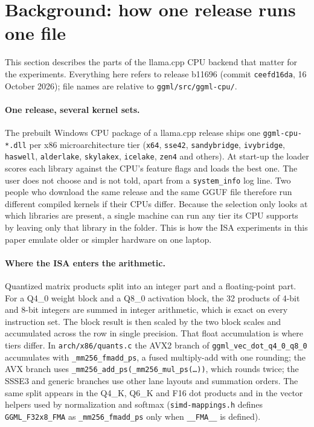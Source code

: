 \section{Background: how one release runs one file}
\label{sec:background}

This section describes the parts of the llama.cpp CPU backend that matter for the experiments.
Everything here refers to release b11696 (commit \texttt{ceefd16da}, 16 October 2026); file
names are relative to \texttt{ggml/src/ggml-cpu/}.

\paragraph{One release, several kernel sets.}
The prebuilt Windows CPU package of a llama.cpp release ships one \texttt{ggml-cpu-*.dll} per
x86 microarchitecture tier (\texttt{x64}, \texttt{sse42}, \texttt{sandybridge},
\texttt{ivybridge}, \texttt{haswell}, \texttt{alderlake}, \texttt{skylakex}, \texttt{icelake},
\texttt{zen4} and others). At start-up the loader scores each library against the CPU's feature
flags and loads the best one. The user does not choose and is not told, apart from a
\texttt{system\_info} log line. Two people who download the same release and the same GGUF file
therefore run different compiled kernels if their CPUs differ. Because the selection only
looks at which libraries are present, a single machine can run any tier its CPU supports by
leaving only that library in the folder. This is how the ISA experiments in this paper emulate
older or simpler hardware on one laptop.

\paragraph{Where the ISA enters the arithmetic.}
Quantized matrix products split into an integer part and a floating-point part. For a Q4\_0
weight block and a Q8\_0 activation block, the 32 products of 4-bit and 8-bit integers are
summed in integer arithmetic, which is exact on every instruction set. The block result is
then scaled by the two block scales and accumulated across the row in single precision.
That float accumulation is where tiers differ. In \texttt{arch/x86/quants.c} the AVX2 branch
of \texttt{ggml\_vec\_dot\_q4\_0\_q8\_0} accumulates with \texttt{\_mm256\_fmadd\_ps}, a fused
multiply-add with one rounding; the AVX branch uses \texttt{\_mm256\_add\_ps(\_mm256\_mul\_ps(\dots))},
which rounds twice; the SSSE3 and generic branches use other lane layouts and summation orders.
The same split appears in the Q4\_K, Q6\_K and F16 dot products and in the vector helpers used
by normalization and softmax (\texttt{simd-mappings.h} defines \texttt{GGML\_F32x8\_FMA} as
\texttt{\_mm256\_fmadd\_ps} only when \texttt{\_\_FMA\_\_} is defined).

